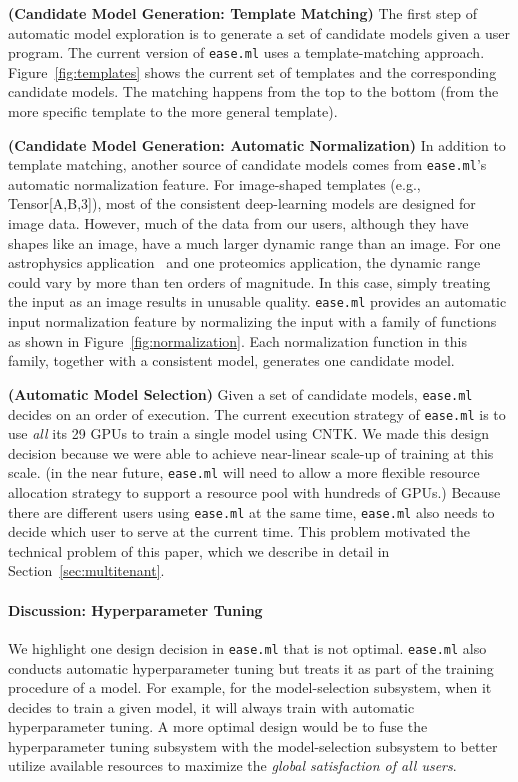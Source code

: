 \documentclass[letterpaper]{vldb}
\newcommand{\eml}{\texttt{ease.ml}\xspace}
\begin{document}
\vspace{0.5em}
\noindent
{\bf (Candidate Model Generation: Template Matching)} 
The first step of automatic
model exploration is to generate a set of 
candidate models given a user program. The current
version of \eml uses a template-matching approach.
Figure~\ref{fig:templates} shows the current set of
templates and the corresponding candidate models. 
The matching happens from the top to the bottom 
(from the more specific template to the more general template).

\vspace{0.5em}
\noindent
{\bf (Candidate Model Generation: Automatic Normalization)} 
In addition to template matching, another source of candidate models 
comes from \eml's automatic normalization feature.
For image-shaped templates (e.g., Tensor[A,B,3]),
most of the consistent deep-learning models are designed for
image data. However, much of the data from our users, although
they have shapes like an image, have a much larger dynamic
range than an image. For one astrophysics application~\cite{MNRAS}
and one proteomics application, the dynamic range could
vary by more than ten orders of magnitude. In this case,
simply treating the input as an image results in unusable 
quality. \eml provides an automatic input
normalization feature by normalizing the input
with a family of functions as shown in Figure~\ref{fig:normalization}.
Each normalization function in this family, together with 
a consistent model, generates one  
candidate model.

\vspace{0.5em}
\noindent
{\bf (Automatic Model Selection)} 
Given a set of candidate models, \eml decides on an order of
execution. The current execution strategy of \eml is to 
use {\em all} its 29 GPUs to train a single 
model using CNTK. We made this design decision 
because we were able to achieve near-linear scale-up
of training at this scale. (in the near 
future, \eml will need to allow a more flexible resource 
allocation strategy to support a resource pool 
with hundreds of GPUs.) Because there are different
users using \eml at the same time, \eml also needs
to decide which user to serve at the current time.
This problem motivated the technical problem of this paper,
which we describe in detail in Section~\ref{sec:multitenant}.

\vspace{-1em}
\paragraph*{Discussion: Hyperparameter Tuning}
We highlight one design decision in \eml
that is not optimal. \eml also conducts automatic
hyperparameter tuning but treats it as part of the
training procedure of a model. For example, for the model-selection
subsystem, when it decides to train a given model,
it will always train with
automatic hyperparameter tuning. A more optimal design 
would be to fuse the hyperparameter tuning subsystem
with the model-selection subsystem to better
utilize available resources to maximize the
{\em global satisfaction of all users}.
\end{document}
